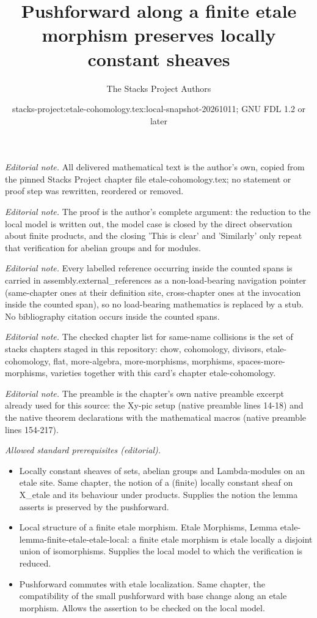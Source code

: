 \documentclass[10pt,a4paper]{amsart}
\title{Pushforward along a finite etale morphism preserves locally constant sheaves}
\author{The Stacks Project Authors}
\date{stacks-project:etale-cohomology.tex:local-snapshot-20261011; GNU FDL 1.2 or later}
\theoremstyle{plain}
\theoremstyle{definition}
\theoremstyle{remark}
\numberwithin{equation}{subsection}
\begin{document}
\maketitle
\noindent\textit{Editorial note.} All delivered mathematical text is the author's own, copied from the pinned Stacks Project chapter file etale-cohomology.tex; no statement or proof step was rewritten, reordered or removed.\par\medskip
\noindent\textit{Editorial note.} The proof is the author's complete argument: the reduction to the local model is written out, the model case is closed by the direct observation about finite products, and the closing 'This is clear' and 'Similarly' only repeat that verification for abelian groups and for modules.\par\medskip
\noindent\textit{Editorial note.} Every labelled reference occurring inside the counted spans is carried in assembly.external\_references as a non-load-bearing navigation pointer (same-chapter ones at their definition site, cross-chapter ones at the invocation inside the counted span), so no load-bearing mathematics is replaced by a stub. No bibliography citation occurs inside the counted spans.\par\medskip
\noindent\textit{Editorial note.} The checked chapter list for same-name collisions is the set of stacks chapters staged in this repository: chow, cohomology, divisors, etale-cohomology, flat, more-algebra, more-morphisms, morphisms, spaces-more-morphisms, varieties together with this card's chapter etale-cohomology.\par\medskip
\noindent\textit{Editorial note.} The preamble is the chapter's own native preamble excerpt already used for this source: the Xy-pic setup (native preamble lines 14-18) and the native theorem declarations with the mathematical macros (native preamble lines 154-217).\par\medskip
\noindent\textit{Allowed standard prerequisites (editorial).}\begin{itemize}
\item Locally constant sheaves of sets, abelian groups and Lambda-modules on an etale site. Same chapter, the notion of a (finite) locally constant sheaf on X\_etale and its behaviour under products. Supplies the notion the lemma asserts is preserved by the pushforward.
\item Local structure of a finite etale morphism. Etale Morphisms, Lemma etale-lemma-finite-etale-etale-local: a finite etale morphism is etale locally a disjoint union of isomorphisms. Supplies the local model to which the verification is reduced.
\item Pushforward commutes with etale localization. Same chapter, the compatibility of the small pushforward with base change along an etale morphism. Allows the assertion to be checked on the local model.
\end{itemize}\medskip
\end{document}
